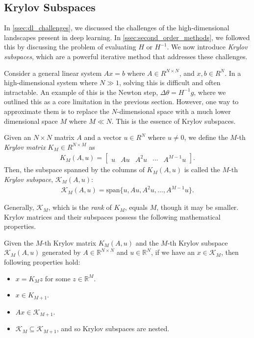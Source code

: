 \subsection{Krylov Subspaces}
\label{ssec:krylov_subspaces}

In \cref{ssec:dl_challenges}, we discussed the challenges of the high-dimensional landscapes present in deep learning. In \cref{ssec:second_order_methods}, we followed this by discussing the problem of evaluating $H$ or $H^{-1}$. We now introduce \textit{Krylov subspaces}, which are a powerful iterative method that addresses these challenges.

Consider a general linear system $Ax = b$ where $A \in R^{N \times N}$, and $x, b \in R^{N}$. In a high-dimensional system where $N \gg 1$, solving this is difficult and often intractable. An example of this is the Newton step, $\Delta \theta = H^{-1} g$, where we outlined this as a core limitation in the previous section. However, one way to approximate them is to replace the $N$-dimensional space with a much lower dimensional space $M$ where $M \ll N$. This is the essence of Krylov subspaces.

\begin{definition}
    Given an $N \times N$ matrix $A$ and a vector $u \in R^N$ where $u \neq 0$, we define the $M$-th \textit{Krylov matrix} $K_M \in R^{N \times M}$ as
    \begin{align}
        K_M(A, u) = \begin{bmatrix} u & A u & A^2 u & \cdots & A^{M-1} u \end{bmatrix}.
        \label{eq:krylov_matrix}
    \end{align}
    Then, the subspace spanned by the columns of $K_M(A, u)$ is called the $M$-th \textit{Krylov subspace}, $\mathcal{K}_M(A, u)$:
    \begin{align}
        \mathcal{K}_M(A, u) = \text{span} \{u, A u, A^2 u, \ldots, A^{M-1} u \}.
    \end{align}
\end{definition}

Generally, $\mathcal{K}_M$, which is the \textit{rank} of $K_M$, equals $M$, though it may be smaller. Krylov matrices and their subspaces possess the following mathematical properties.
\begin{definition}
    Given the $M$-th Krylov matrix $K_M(A, u)$ and the $M$-th Krylov subspace $\mathcal{K}_M(A, u)$ generated by $A \in \mathbb{R}^{N \times N}$ and $u \in \mathbb{R}^N$, if we have an $x \in \mathcal{K}_M$, then following properties hold:
    \begin{itemize}
        \item $x = K_M z$ for some $z \in \mathbb{R}^M$.
        \item $x \in K_{M+1}$.
        \item $A x \in \mathcal{K}_{M+1}$.
        \item $\mathcal{K}_M \subseteq \mathcal{K}_{M+1}$, and so Krylov subspaces are nested.
    \end{itemize}
    \label{definition:krylov_properties}
\end{definition}

